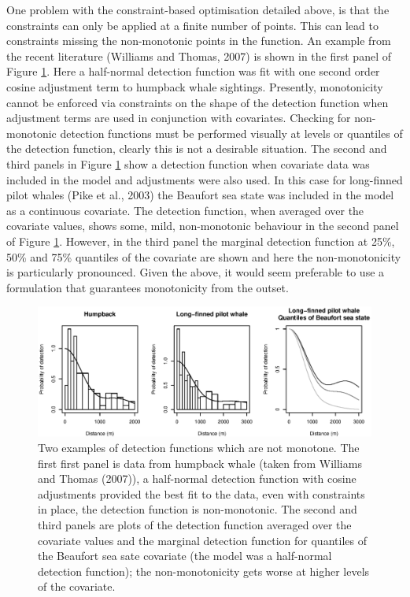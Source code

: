 \documentclass[useAMS,referee, usegraphicx]{biom}
\begin{document}
One problem with the constraint-based optimisation detailed above, is that the constraints can only be applied at a finite number of points. This can lead to constraints missing the non-monotonic points in the function. An example from the recent literature (Williams and Thomas, 2007) is shown in the first panel of Figure \ref{fig1}. Here a half-normal detection function was fit with one second order cosine adjustment term to humpback whale sightings. Presently, monotonicity cannot be enforced via constraints on the shape of the detection function when adjustment terms are used in conjunction with covariates. Checking for non-monotonic detection functions must be performed visually at levels or quantiles of the detection function, clearly this is not a desirable situation. The second and third panels in Figure \ref{fig1} show a detection function when covariate data was included in the model and adjustments were also used. In this case for long-finned pilot whales (Pike et al., 2003) the Beaufort sea state was included in the model as a continuous covariate. The detection function, when averaged over the covariate values, shows some, mild, non-monotonic behaviour in the second panel of Figure \ref{fig1}. However, in the third panel the marginal detection function at 25\%, 50\% and 75\% quantiles of the covariate are shown and here the non-monotonicity is particularly pronounced. Given the above, it would seem preferable to use a formulation that guarantees monotonicity from the outset.

\begin{figure}
\centering
\includegraphics[width=\textwidth]{figs/figure1.eps}
\caption{Two examples of detection functions which are not monotone. The first first panel is data from humpback whale (taken from Williams and Thomas (2007)), a half-normal detection function with cosine adjustments provided the best fit to the data, even with constraints in place, the detection function is non-monotonic. The second and third panels are plots of the detection function averaged over the covariate values and the marginal detection function for quantiles of the Beaufort sea sate covariate (the model was a half-normal detection function); the non-monotonicity gets worse at higher levels of the covariate.}
\label{fig1}
\end{figure}
\end{document}

